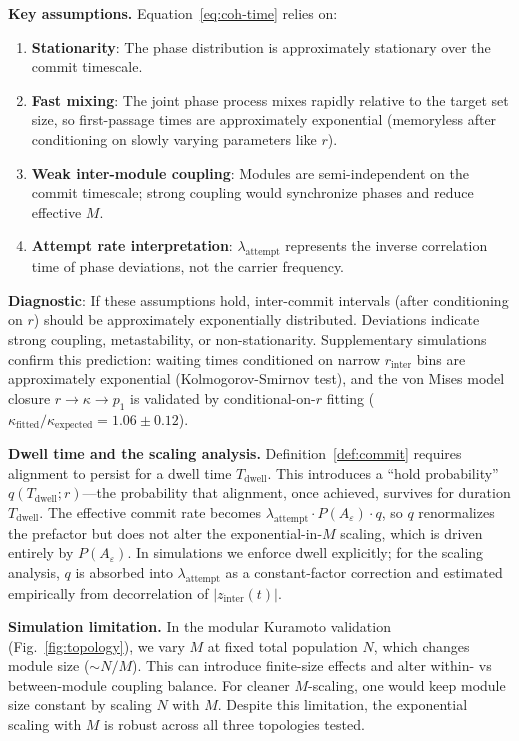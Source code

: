\documentclass[12pt]{article}
\begin{document}
\textbf{Key assumptions.} Equation~\ref{eq:coh-time} relies on:
\begin{enumerate}
\item \textbf{Stationarity}: The phase distribution is approximately stationary over the commit timescale.
\item \textbf{Fast mixing}: The joint phase process mixes rapidly relative to the target set size, so first-passage times are approximately exponential (memoryless after conditioning on slowly varying parameters like $r$).
\item \textbf{Weak inter-module coupling}: Modules are semi-independent on the commit timescale; strong coupling would synchronize phases and reduce effective $M$.
\item \textbf{Attempt rate interpretation}: $\lambda_{\mathrm{attempt}}$ represents the inverse correlation time of phase deviations, not the carrier frequency.
\end{enumerate}
\textbf{Diagnostic}: If these assumptions hold, inter-commit intervals (after conditioning on $r$) should be approximately exponentially distributed. Deviations indicate strong coupling, metastability, or non-stationarity. Supplementary simulations confirm this prediction: waiting times conditioned on narrow $r_{\mathrm{inter}}$ bins are approximately exponential (Kolmogorov-Smirnov test), and the von Mises model closure $r \to \kappa \to p_1$ is validated by conditional-on-$r$ fitting ($\kappa_{\mathrm{fitted}}/\kappa_{\mathrm{expected}} = 1.06 \pm 0.12$).

\textbf{Dwell time and the scaling analysis.} Definition~\ref{def:commit} requires alignment to persist for a dwell time $T_{\mathrm{dwell}}$. This introduces a ``hold probability'' $q(T_{\mathrm{dwell}}; r)$---the probability that alignment, once achieved, survives for duration $T_{\mathrm{dwell}}$. The effective commit rate becomes $\lambda_{\mathrm{attempt}} \cdot P(A_\varepsilon) \cdot q$, so $q$ renormalizes the prefactor but does not alter the exponential-in-$M$ scaling, which is driven entirely by $P(A_\varepsilon)$. In simulations we enforce dwell explicitly; for the scaling analysis, $q$ is absorbed into $\lambda_{\mathrm{attempt}}$ as a constant-factor correction and estimated empirically from decorrelation of $|z_{\mathrm{inter}}(t)|$.

\textbf{Simulation limitation.} In the modular Kuramoto validation (Fig.~\ref{fig:topology}), we vary $M$ at fixed total population $N$, which changes module size ($\sim N/M$). This can introduce finite-size effects and alter within- vs between-module coupling balance. For cleaner $M$-scaling, one would keep module size constant by scaling $N$ with $M$. Despite this limitation, the exponential scaling with $M$ is robust across all three topologies tested.
\end{document}
